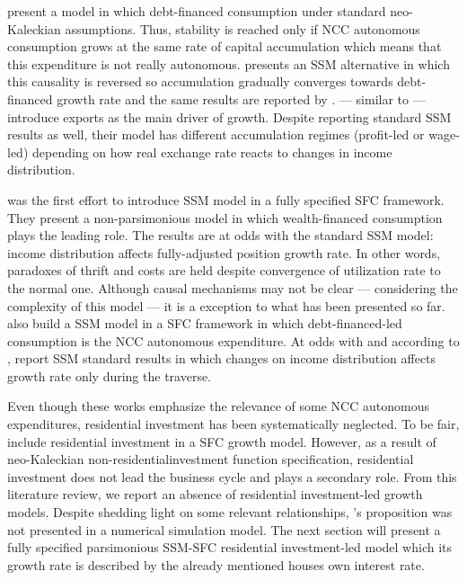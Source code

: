 \documentclass[11pt]{article}
\begin{document}
\textcites{dutt_maturity_2006}{palley_inside_2010}{hein_finance-dominated_2012} present a model in which debt-financed consumption under standard neo-Kaleckian assumptions.
Thus, stability is reached only if NCC autonomous consumption grows at the same rate of capital accumulation which means that this expenditure is not really autonomous. 
\textcite{pariboni_autonomous_2015} presents an SSM alternative in which this causality is reversed so accumulation gradually converges towards debt-financed growth rate and the same results are reported by \textcite{lavoie_convergence_2016}.
\textcite{nah_long-run_2017} --- similar to \textcite{dejuan_hidden_2017} --- introduce exports as the main driver of growth. 
Despite reporting standard SSM results as well, their model has different accumulation regimes (profit-led or wage-led) depending on how real exchange rate reacts to changes in income distribution.

\textcite{brochier_supermultiplier_2018} was the first effort to introduce SSM model in a fully specified SFC framework. 
They present a non-parsimonious model in which wealth-financed consumption plays the leading role.
The results are at odds with the standard SSM model: income distribution affects fully-adjusted position growth rate.
In other words, paradoxes of thrift and costs are held despite convergence of utilization rate to the normal one.
Although causal mechanisms may not be clear --- considering the complexity of this model --- it is a  exception to what has been presented so far.
\textcite{mandarino-2020-worker-debt} also build a SSM model in a SFC framework in which debt-financed-led consumption is the NCC autonomous expenditure.
At odds with \textcite{brochier_supermultiplier_2018} and according to \textcites{pariboni_autonomous_2015}{lavoie_convergence_2016}, \textcite{mandarino-2020-worker-debt} report SSM standard results in which changes on income distribution affects growth rate only during the traverse.


Even though these works emphasize the relevance of some NCC autonomous expenditures, residential investment has been systematically neglected.
To be fair, \textcites{zezza_u.s._2008}{nikolaidi_securitisation_2015} include residential investment in a SFC growth model.
However, as a result of neo-Kaleckian non-residentialinvestment function specification, residential investment does not lead the business cycle and plays a secondary role.
From this literature review, we report an absence of residential investment-led growth models. 
Despite shedding light on some relevant relationships, \citeauthor*{teixeira_crescimento_2015}'s \citeyear{teixeira_crescimento_2015} proposition was not presented in a numerical simulation model.
The next section will present a fully specified parsimonious SSM-SFC residential investment-led model 
which its growth rate is described by the already mentioned houses own interest rate.
\end{document}
